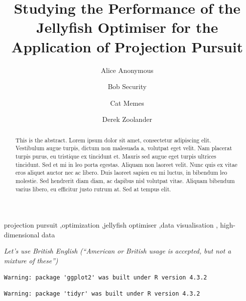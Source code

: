 \documentclass[
  number,
  preprint,
  3p]{elsarticle}
\begin{document}
\begin{frontmatter}
\title{Studying the Performance of the Jellyfish Optimiser for the
Application of Projection Pursuit}
\author[1]{Alice Anonymous%
%
}
\author[2]{Bob Security%
%
}
\author[2]{Cat Memes%
%
}
\author[]{Derek Zoolander%
%
}






        
\begin{abstract}
This is the abstract. Lorem ipsum dolor sit amet, consectetur adipiscing
elit. Vestibulum augue turpis, dictum non malesuada a, volutpat eget
velit. Nam placerat turpis purus, eu tristique ex tincidunt et. Mauris
sed augue eget turpis ultrices tincidunt. Sed et mi in leo porta
egestas. Aliquam non laoreet velit. Nunc quis ex vitae eros aliquet
auctor nec ac libero. Duis laoreet sapien eu mi luctus, in bibendum leo
molestie. Sed hendrerit diam diam, ac dapibus nisl volutpat vitae.
Aliquam bibendum varius libero, eu efficitur justo rutrum at. Sed at
tempus elit.
\end{abstract}





\begin{keyword}
    projection pursuit \sep optimization \sep jellyfish
optimiser \sep data visualisation \sep 
    high-dimensional data
\end{keyword}
\end{frontmatter}
    
\emph{Let's use British English (``American or British usage is
accepted, but not a mixture of these'')}

\begin{verbatim}
Warning: package 'ggplot2' was built under R version 4.3.2
\end{verbatim}

\begin{verbatim}
Warning: package 'tidyr' was built under R version 4.3.2
\end{verbatim}
\end{document}
